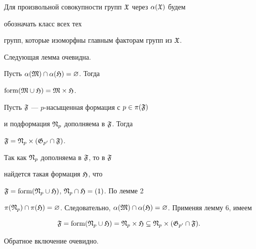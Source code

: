  


Для произвольной совокупности групп $\frak X$ через $\alpha(\frak X)$ будем 


обозначать класс всех тех 


групп, которые изоморфны главным факторам групп из $\frak X$. 


 


Следующая лемма очевидна. 


 


\begin{lem} Пусть $\alpha(\frak M)\cap\alpha(\frak H)=\varnothing$. Тогда 


$\operatorname{form}(\frak M\cup\frak H)=\frak M\times\frak H$. 


\end{lem} 


 


\begin{lem} Пусть $\frak F$ --- $p$-насыщенная формация с $p\in\pi(\frak F)$ 


и подформация $\frak N_p$ дополняема в $\frak F$. Тогда


$\frak F=\frak N_p\times(\frak G_{p'}\cap\frak F)$. 


\end{lem} 


 


\begin{pf} Так как $\frak N_p$ дополняема в $\frak F$, то в $\frak F$ 


найдется такая формация $\frak H$, что 


$\frak F=\operatorname{form}(\frak N_p\cup\frak H)$, $\frak N_p\cap\frak H=(1)$. По лемме 2 


$\pi(\frak N_p)\cap\pi(\frak H)=\varnothing$. Следовательно, $\alpha(\frak 


M)\cap\alpha(\frak H)=\varnothing$. Применяя лемму 6, имеем 


$$ 


\frak F=\form(\frak N_p\cup\frak H)=\frak N_p\times\frak H\subseteq\frak N_p 


\times(\frak G_{p'}\cap\frak F). 


$$ 


Обратное включение очевидно.


\end{pf} 


 


